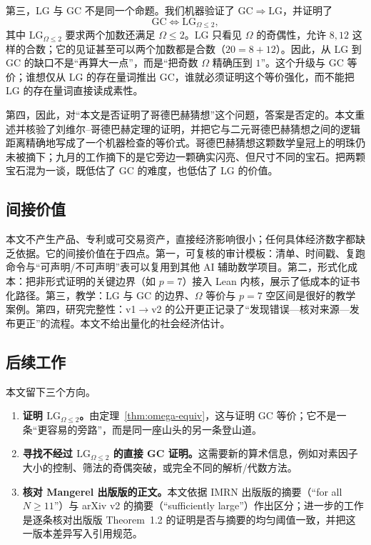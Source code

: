 \documentclass[11pt,a4paper]{ctexart}
\theoremstyle{plain}
\theoremstyle{definition}
\newcommand{\Om}{\Omega}
\newcommand{\GC}{\mathrm{GC}}
\newcommand{\LG}{\mathrm{LG}}
\newcommand{\LGtwo}{\mathrm{LG}_{\Om\le2}}
\begin{document}
第三，LG 与 GC 不是同一个命题。我们机器验证了 $\GC\Rightarrow\LG$，并证明了
\[
  \GC\iff\LGtwo,
\]
其中 $\LGtwo$ 要求两个加数还满足 $\Om\le2$。LG 只看见 $\Om$ 的奇偶性，允许 $8,12$ 这样的合数；它的见证甚至可以两个加数都是合数（$20=8+12$）。因此，从 LG 到 GC 的缺口不是“再算大一点”，而是“把奇数 $\Om$ 精确压到 $1$”。这个升级与 GC 等价；谁想仅从 LG 的存在量词推出 GC，谁就必须证明这个等价强化，而不能把 LG 的存在量词直接读成素性。

第四，因此，对“本文是否证明了哥德巴赫猜想”这个问题，答案是否定的。本文重述并核验了刘维尔--哥德巴赫定理的证明，并把它与二元哥德巴赫猜想之间的逻辑距离精确地写成了一个机器检查的等价式。哥德巴赫猜想这颗数学皇冠上的明珠仍未被摘下；九月的工作摘下的是它旁边一颗确实闪亮、但尺寸不同的宝石。把两颗宝石混为一谈，既低估了 GC 的难度，也低估了 LG 的价值。

\subsection{间接价值}
本文不产生产品、专利或可交易资产，直接经济影响很小；任何具体经济数字都缺乏依据。它的间接价值在于四点。第一，可复核的审计模板：清单、时间戳、复跑命令与“可声明/不可声明”表可以复用到其他 AI 辅助数学项目。第二，形式化成本：把非形式证明的关键边界（如 \(p=7\)）接入 Lean 内核，展示了低成本的证书化路径。第三，教学：LG 与 GC 的边界、\(\Omega\) 等价与 \(p=7\) 空区间是很好的教学案例。第四，研究完整性：v1\(\to\)v2 的公开更正记录了“发现错误—核对来源—发布更正”的流程。本文不给出量化的社会经济估计。

\subsection*{后续工作}
\label{sec:future}

本文留下三个方向。
\begin{enumerate}
\item \textbf{证明 $\LGtwo$。}由定理~\ref{thm:omega-equiv}，这与证明 GC 等价；它不是一条“更容易的旁路”，而是同一座山头的另一条登山道。
\item \textbf{寻找不经过 $\LGtwo$ 的直接 GC 证明。}这需要新的算术信息，例如对素因子大小的控制、筛法的奇偶突破，或完全不同的解析/代数方法。
\item \textbf{核对 Mangerel 出版版的正文。}本文依据 IMRN 出版版的摘要（“for all $N\ge11$”）与 arXiv v2 的摘要（“sufficiently large”）作出区分；进一步的工作是逐条核对出版版 Theorem~1.2 的证明是否与摘要的均匀阈值一致，并把这一版本差异写入引用规范。
\end{enumerate}
\end{document}
